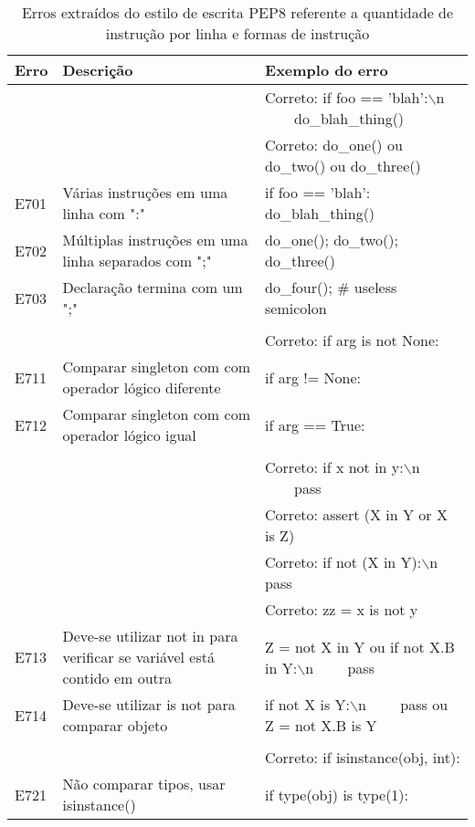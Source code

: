 	\begin{table}
		\scriptsize
		\begin{tabularx}{\linewidth}{ |l|X|X| }
			\hline
			\textbf{Erro}
			& \textbf{Descrição}
			& \textbf{Exemplo do erro} \\
			\hline
			
			& 
			& Correto: if foo == 'blah':$\backslash$n \ \ \ \ do\_blah\_thing() \\
			\hline
			
			& 
			& Correto: do\_one() ou do\_two() ou do\_three() \\
			\hline
			E701 
			& Várias instruções em uma linha com ":" 
			& if foo == 'blah': do\_blah\_thing() \\
			\hline
			E702 
			& Múltiplas instruções em uma linha separados com ";" 
			& do\_one(); do\_two(); do\_three() \\
			\hline
			E703 
			& Declaração termina com um ";" 
			& do\_four();  \# useless semicolon \\
			\hline
			
			& 
			&  \\
			\hline
			
			& 
			& Correto: if arg is not None: \\
			\hline
			E711 
			& Comparar singleton com com operador lógico diferente
			& if arg != None: \\
			\hline
			E712 
			& Comparar singleton com com operador lógico igual
			& if arg == True: \\
			\hline
			
			& 
			&  \\
			\hline
			
			& 
			& Correto: if x not in y:$\backslash$n \ \ \ \ pass \\
			\hline
			
			& 
			& Correto: assert (X in Y or X is Z) \\
			\hline
			
			& 
			& Correto: if not (X in Y):$\backslash$n    pass \\
			\hline
			
			& 
			& Correto: zz = x is not y \\
			\hline
			E713 
			& Deve-se utilizar not in para verificar se variável está contido em outra 
			& Z = not X in Y ou if not X.B in Y:$\backslash$n \ \ \ \ pass \\
			\hline
			E714 
			& Deve-se utilizar is not para comparar objeto 
			& if not X is Y:$\backslash$n \ \ \ \ pass ou Z = not X.B is Y \\
			\hline
			
			& 
			&  \\
			\hline
			
			& 
			& Correto: if isinstance(obj, int): \\
			\hline
			E721 
			& Não comparar tipos, usar isinstance() 
			& if type(obj) is type(1): \\
			\hline
		\end{tabularx}
		\caption{Erros extraídos do estilo de escrita PEP8 referente a quantidade de instrução por linha e formas de instrução}
		\label{tab:pep8E700}
	\end{table}

